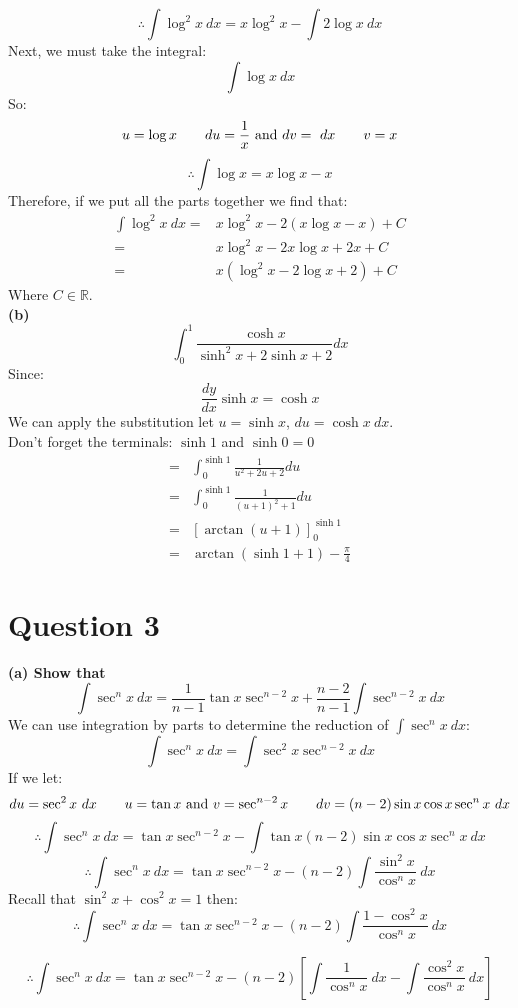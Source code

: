 \documentclass[12pt]{article}
\begin{document}
$$
\therefore \int \log^2 x \ dx = x \log^2 x - \int 2\log x \ dx
$$
Next, we must take the integral:
$$
\int \log x \ dx
$$
So:
$$
u = \log x \hspace{20px} du = \frac{1}{x} \text{ and } dv = \ dx \hspace{20px} v = x 
$$
$$
\therefore \int \log x = x \log x - x
$$
Therefore, if we put all the parts together we find that:
\begin{align*}
	\int \log^2 x \ dx =& x \log ^2 x - 2(x \log x - x) + C\\
	=& x \log ^2 x - 2x \log x + 2x + C\\
	=& x(\log ^2 x -2 \log x + 2) + C
\end{align*}
Where $C \in \mathbb{R}$.\\
\bigskip
\textbf{(b)}\\
$$
\int_{0}^{1}\frac{\cosh x}{\sinh^2 x + 2 \sinh x + 2}dx
$$
Since:
$$
\frac{dy}{dx}\sinh x=\cosh x
$$
We can apply the substitution let $u=\sinh x$, $du = \cosh x \ dx$.\\
Don't forget the terminals: $\sinh 1$ and $\sinh 0=0$
\begin{align*}
	=&\int_{0}^{\sinh 1}\frac{1}{u^2+2u+2}du\\
	=&\int_{0}^{\sinh 1}\frac{1}{(u+1)^2+1}du\\
	=&\left[ \arctan(u+1) \right]^{\sinh 1}_{0}\\
	=& \arctan(\sinh 1 +1) - \frac{\pi}{4}
\end{align*}
\section*{Question 3}
\textbf{(a) Show that}
$$
\int \sec^n x \ dx = \frac{1}{n - 1} \tan x \sec^{n-2} x + \frac{n-2}{n-1}\int \sec^{n-2} x \ dx
$$
We can use integration by parts to determine the reduction of $\int \sec^n x \ dx$:
$$
\int \sec^n x \ dx = \int \sec^2 x \sec^{n-2}x \ dx
$$
If we let:
$$
du = \sec^2 x \ dx \hspace{20px} u = \tan x \text{ and } v = \sec^{n-2}x \hspace{20px} dv= (n-2)\sin x \cos x \sec^n x \ dx
$$
$$
\therefore \int \sec^n x \ dx = \tan x \sec^{n-2} x - \int \tan x (n-2)\sin x \cos x \sec^n x \ dx
$$
$$
\therefore \int \sec^n x \ dx = \tan x \sec^{n-2} x - (n-2) \int \frac{\sin^2 x}{\cos^n x} \ dx
$$
Recall that $\sin^2 x + \cos^2 x = 1$ then:
$$
\therefore \int \sec^n x \ dx = \tan x \sec^{n-2} x - (n-2) \int \frac{1 - \cos^2 x}{\cos^n x} \ dx
$$

$$
\therefore \int \sec^n x \ dx = \tan x \sec^{n-2} x - (n-2) \left[ \int \frac{1}{\cos^n x} \ dx - \int \frac{\cos^2 x}{\cos^n x} \ dx \right]
$$
\end{document}
